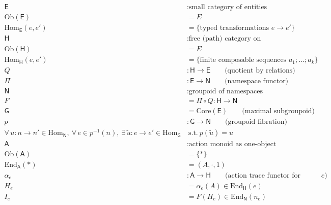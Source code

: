 \documentclass[11pt,oneside]{article}
\begin{document}
\begin{align}
\mathsf{E} &: \text{small category of entities} \\[4pt]
\mathrm{Ob}(\mathsf{E}) &= E \\[4pt]
\mathrm{Hom}_{\mathsf{E}}(e,e') &= \{\text{typed transformations } e \to e'\} \\[10pt]

\mathsf{H} &: \text{free (path) category on transformation generators} \\[4pt]
\mathrm{Ob}(\mathsf{H}) &= E \\[4pt]
\mathrm{Hom}_{\mathsf{H}}(e,e') &= \{\text{finite composable sequences } a_1;\dots;a_k\} \\[10pt]

Q &: \mathsf{H} \to \mathsf{E} \qquad \text{(quotient by relations)} \\[10pt]

\Pi &: \mathsf{E} \to \mathsf{N} \qquad \text{(namespace functor)} \\[6pt]
\mathsf{N} &: \text{groupoid of namespaces} \\[10pt]

F &= \Pi \circ Q : \mathsf{H} \to \mathsf{N} \\[14pt]

\mathsf{G} &= \mathrm{Core}(\mathsf{E}) \qquad \text{(maximal subgroupoid)} \\[10pt]

p &: \mathsf{G} \to \mathsf{N} \qquad \text{(groupoid fibration)} \\[12pt]

\forall\, u:n\to n' \in \mathrm{Hom}_{\mathsf{N}},\ \forall\, e \in p^{-1}(n),\ 
\exists\, \tilde{u}:e\to e' \in \mathrm{Hom}_{\mathsf{G}}
&\ \text{s.t.}\ p(\tilde{u})=u
\\[14pt]

\mathsf{A} &: \text{action monoid as one-object category} \\[4pt]
\mathrm{Ob}(\mathsf{A}) &= \{\ast\} \\[4pt]
\mathrm{End}_{\mathsf{A}}(\ast) &= (A,\cdot,1) \\[10pt]

\alpha_e &: \mathsf{A} \to \mathsf{H} \qquad \text{(action trace functor for entity $e$)} \\[10pt]

H_e &= \alpha_e(A) \in \mathrm{End}_{\mathsf{H}}(e) \\[12pt]

I_e &= F(H_e) \in \mathrm{End}_{\mathsf{N}}(n_e) \\[16pt]


\end{align}
\end{document}
